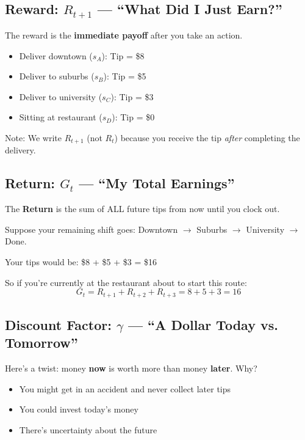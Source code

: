 \documentclass[journal, onecolumn]{IEEEtran}
\newcommand{\vocab}[1]{\textbf{\textcolor{Garnet}{#1}}}
\begin{document}
\subsection{Reward: $R_{t+1}$ --- ``What Did I Just Earn?''}

The reward is the \textbf{immediate payoff} after you take an action.

\begin{tcolorbox}[examplebox={Concrete Tip Values}]
\begin{itemize}
    \item Deliver downtown ($s_A$): Tip = \$8
    \item Deliver to suburbs ($s_B$): Tip = \$5
    \item Deliver to university ($s_C$): Tip = \$3
    \item Sitting at restaurant ($s_D$): Tip = \$0
\end{itemize}
Note: We write $R_{t+1}$ (not $R_t$) because you receive the tip \textit{after} completing the delivery.
\end{tcolorbox}

\subsection{Return: $G_t$ --- ``My Total Earnings''}

The \vocab{Return} is the sum of ALL future tips from now until you clock out.

\begin{tcolorbox}[examplebox={A Sample Shift}]
Suppose your remaining shift goes: Downtown $\rightarrow$ Suburbs $\rightarrow$ University $\rightarrow$ Done.

Your tips would be: \$8 + \$5 + \$3 = \$16

So if you're currently at the restaurant about to start this route:
\[ G_t = R_{t+1} + R_{t+2} + R_{t+3} = 8 + 5 + 3 = 16 \]
\end{tcolorbox}

\subsection{Discount Factor: $\gamma$ --- ``A Dollar Today vs. Tomorrow''}

Here's a twist: money \textbf{now} is worth more than money \textbf{later}. Why?
\begin{itemize}
    \item You might get in an accident and never collect later tips
    \item You could invest today's money
    \item There's uncertainty about the future
\end{itemize}
\end{document}
